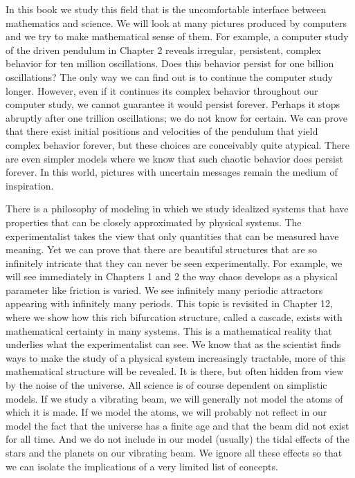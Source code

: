 \documentclass{article}
\begin{document}
In this book we study this field that is the uncomfortable interface between
mathematics and science. We will look at many pictures produced by computers
and we try to make mathematical sense of them. For example, a computer study of
the driven pendulum in Chapter 2 reveals irregular, persistent, complex behavior
for ten million oscillations. Does this behavior persist for one billion oscillations?
The only way we can find out is to continue the computer study longer. However,
even if it continues its complex behavior throughout our computer study, we
cannot guarantee it would persist forever. Perhaps it stops abruptly after one
trillion oscillations; we do not know for certain. We can prove that there exist
initial positions and velocities of the pendulum that yield complex behavior
forever, but these choices are conceivably quite atypical. There are even simpler
models where we know that such chaotic behavior does persist forever. In this
world, pictures with uncertain messages remain the medium of inspiration.

There is a philosophy of modeling in which we study idealized systems
that have properties that can be closely approximated by physical systems. The
experimentalist takes the view that only quantities that can be measured have
meaning. Yet we can prove that there are beautiful structures that are so infinitely
intricate that they can never be seen experimentally. For example, we will see
immediately in Chapters 1 and 2 the way chaos develops as a physical parameter
like friction is varied. We see infinitely many periodic attractors appearing with
infinitely many periods. This topic is revisited in Chapter 12, where we show
how this rich bifurcation structure, called a cascade, exists with mathematical
certainty in many systems. This is a mathematical reality that underlies what
the experimentalist can see. We know that as the scientist finds ways to make
the study of a physical system increasingly tractable, more of this mathematical
structure will be revealed. It is there, but often hidden from view by the noise of
the universe. All science is of course dependent on simplistic models. If we study
a vibrating beam, we will generally not model the atoms of which it is made.
If we model the atoms, we will probably not reflect in our model the fact that
the universe has a finite age and that the beam did not exist for all time. And
we do not include in our model (usually) the tidal effects of the stars and the
planets on our vibrating beam. We ignore all these effects so that we can isolate
the implications of a very limited list of concepts.
\end{document}
